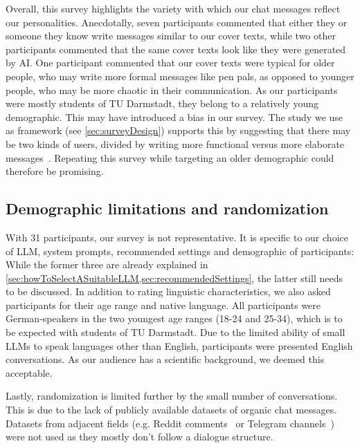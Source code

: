 Overall, this survey highlights the variety with which our chat messages reflect our personalities. Anecdotally, seven participants commented that either they or someone they know write messages similar to our cover texts, while two other participants commented that the same cover texts look like they were generated by \gls{AI}. One participant commented that our cover texts were typical for older people, who may write more formal messages like pen pals, as opposed to younger people, who may be more chaotic in their communication. As our participants were mostly students of TU Darmstadt, they belong to a relatively young demographic. This may have introduced a bias in our survey. The study we use as framework (see \cref{sec:surveyDesign}) supports this by suggesting that there may be two kinds of users, divided by writing more functional versus more elaborate messages~\cite{alazzawieLinguisticSituationalFeatures2022}. Repeating this survey while targeting an older demographic could therefore be promising.

\subsection{Demographic limitations and randomization}
\label{sec:demographicLimitationsAndRandomization}
With 31 participants, our survey is not representative. It is specific to our choice of \gls{LLM}, system prompts, recommended settings and demographic of participants: While the former three are already explained in \cref{sec:howToSelectASuitableLLM,sec:recommendedSettings}, the latter still needs to be discussed. In addition to rating linguistic characteristics, we also asked participants for their age range and native language. All participants were German-speakers in the two youngest age ranges (18-24 and 25-34), which is to be expected with students of TU Darmstadt. Due to the limited ability of small \glspl{LLM} to speak languages other than English, participants were presented English conversations. As our audience has a scientific background, we deemed this acceptable.

Lastly, randomization is limited further by the small number of conversations. This is due to the lack of publicly available datasets of organic chat messages. Datasets from adjacent fields (e.g. Reddit comments~\cite{baumgartnerPushshiftRedditDataset2020} or Telegram channels~\cite{morgiaTGDatasetCollectingExploring2025}) were not used as they mostly don't follow a dialogue structure.
